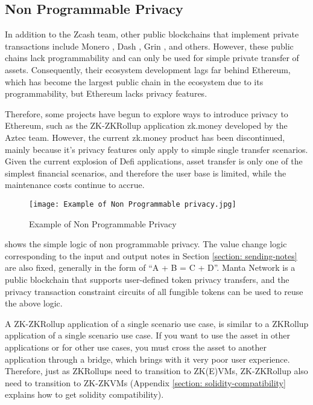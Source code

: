\subsection{Non Programmable Privacy}

In addition to the Zcash team, other public blockchains that implement private transactions include Monero \cite{website:Monero}, Dash \cite{website:Dash}, Grin \cite{website:Grin}, and others. However, these public chains lack programmability and can only be used for simple private transfer of assets. Consequently, their ecosystem development lags far behind Ethereum, which has become the largest public chain in the ecosystem due to its programmability, but Ethereum lacks privacy features.

Therefore, some projects have begun to explore ways to introduce privacy to Ethereum, such as the ZK-ZKRollup application zk.money \cite{website:zk.money} developed by the Aztec \cite{website:Aztec} team. However, the current zk.money product has been discontinued, mainly because it's privacy features only apply to simple single transfer scenarios. Given the current explosion of Defi applications, asset transfer is only one of the simplest financial scenarios, and therefore the user base is limited, while the maintenance costs continue to accrue.
\begin{figure}[!ht]
    \centering
    \texttt{[image: Example of Non Programmable privacy.jpg]}
    \caption{Example of Non Programmable Privacy}
    \label{fig:Example of Non Programmable Privacy}
\end{figure}

 shows the simple logic of non programmable privacy. The value change logic corresponding to the input and output notes in Section \ref{section: sending-notes} are also fixed, generally in the form of ``A + B = C + D''. Manta Network \cite{website:Manta-network} is a public blockchain that supports user-defined token privacy transfers, and the privacy transaction 
constraint circuits of all fungible tokens can be used to reuse the above logic.

A ZK-ZKRollup application of a single scenario use case, is similar to a ZKRollup application of a single scenario use case. If you want to use the asset in other applications or for other use cases, you must cross the asset to another application through a bridge, which brings with it very poor user experience. Therefore, just as ZKRollups need to 
transition to ZK(E)VMs, ZK-ZKRollup also need to transition to ZK-ZKVMs (Appendix \ref{section: solidity-compatibility} explains how to get solidity compatibility).
